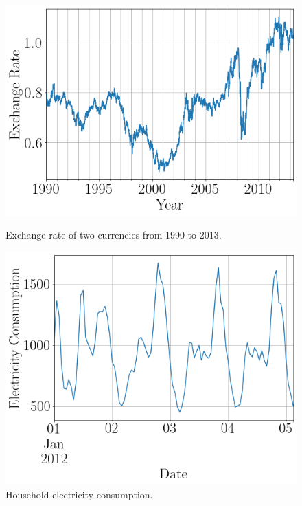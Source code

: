 \begin{figure}[htb]
  \centering
  \includegraphics[width=\linewidth]{./img/exchange_rate_zoomed_2.png}
  \caption{Exchange rate of two currencies from 1990 to 2013.}
  \label{fig:example_timeseries}
  \endminipage\hfill
  \includegraphics[width=\linewidth]{./img/electricity_zoomed_3.png}
  \caption{Household electricity consumption.}
  \label{fig:example_timeseries_electricity}
  \endminipage\hfill
\end{figure}

